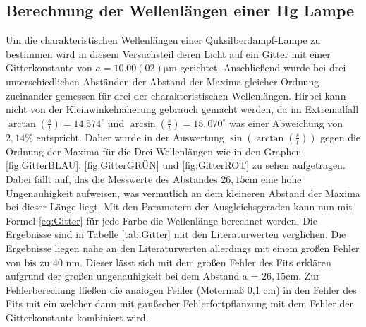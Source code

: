 \documentclass[11pt, a4paper]{article}
\begin{document}
    \subsection{Berechnung der Wellenlängen einer Hg Lampe}
    Um die charakteristischen Wellenlängen einer Quksilberdampf-Lampe zu bestimmen wird in diesem Versuchsteil deren Licht auf ein Gitter mit einer Gitterkonstante von $a=10.00(02) \si{\micro\metre}$ gerichtet.
    Anschließend wurde bei drei unterschiedlichen Abständen der Abstand der Maxima gleicher Ordnung zueinander gemessen für drei der charakteristischen Wellenlängen. Hirbei kann nicht von der Kleinwinkelnäherung gebrauch gemacht werden, da im Extremalfall $\arctan(\frac{s}{l}) = 14.574^{\circ}$ und $\arcsin(\frac{s}{l}) = 15,070^{\circ}$
    was einer Abweichung von $2,14\%$ entspricht. Daher wurde in der Auswertung $\sin(\arctan(\frac{s}{l}))$ gegen die Ordnung der Maxima für die Drei Wellenlängen wie in den Graphen \ref{fig:GitterBLAU}, \ref{fig:GitterGRÜN} und \ref{fig:GitterROT} zu sehen aufgetragen.
    Dabei fällt auf, das die Messwerte des Abstandes $26,15 \si{\centi\metre}$ eine hohe Ungenauhigkeit aufweisen, was vermutlich an dem kleineren Abstand der Maxima bei dieser Länge liegt.
    Mit den Parametern der Ausgleichsgeraden kann nun mit Formel \ref{eq:Gitter} für jede Farbe die Wellenlänge berechnet werden. Die Ergebnisse sind in Tabelle \ref{tab:Gitter} mit den Literaturwerten verglichen. Die Ergebnisse liegen nahe an den Literaturwerten allerdings mit einem großen Fehler von bis zu 40 nm.
    Dieser lässt sich mit dem großen Fehler des Fits erklären aufgrund der großen ungenauhigkeit bei dem Abstand a =  $26,15 \si{\centi\metre}$. Zur Fehlerberechung fließen die analogen Fehler (Metermaß 0,1 cm) in den Fehler des Fits mit ein welcher dann mit gaußscher Fehlerfortpflanzung mit dem Fehler der Gitterkonstante kombiniert wird.
\end{document}
